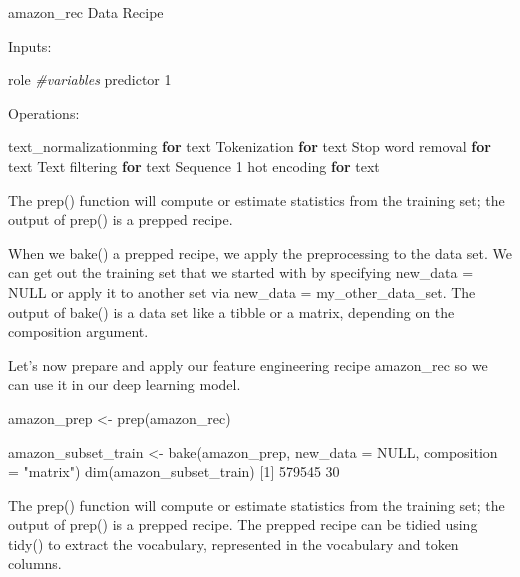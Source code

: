 \documentclass[
]{article}
\newenvironment{Shaded}{}{}
\newcommand{\AttributeTok}[1]{\textcolor[rgb]{0.49,0.56,0.16}{#1}}
\newcommand{\CommentTok}[1]{\textcolor[rgb]{0.38,0.63,0.69}{\textit{#1}}}
\newcommand{\ConstantTok}[1]{\textcolor[rgb]{0.53,0.00,0.00}{#1}}
\newcommand{\ControlFlowTok}[1]{\textcolor[rgb]{0.00,0.44,0.13}{\textbf{#1}}}
\newcommand{\DecValTok}[1]{\textcolor[rgb]{0.25,0.63,0.44}{#1}}
\newcommand{\FunctionTok}[1]{\textcolor[rgb]{0.02,0.16,0.49}{#1}}
\newcommand{\NormalTok}[1]{#1}
\newcommand{\OtherTok}[1]{\textcolor[rgb]{0.00,0.44,0.13}{#1}}
\newcommand{\SpecialCharTok}[1]{\textcolor[rgb]{0.25,0.44,0.63}{#1}}
\newcommand{\StringTok}[1]{\textcolor[rgb]{0.25,0.44,0.63}{#1}}
\begin{document}
\begin{Shaded}
\begin{Highlighting}[]
\NormalTok{amazon\_rec}
\NormalTok{Data Recipe}

\NormalTok{Inputs}\SpecialCharTok{:}

\NormalTok{      role }\CommentTok{\#variables}
\NormalTok{ predictor          }\DecValTok{1}

\NormalTok{Operations}\SpecialCharTok{:}

\NormalTok{text\_normalizationming }\ControlFlowTok{for}\NormalTok{ text}
\NormalTok{Tokenization }\ControlFlowTok{for}\NormalTok{ text}
\NormalTok{Stop word removal }\ControlFlowTok{for}\NormalTok{ text}
\NormalTok{Text filtering }\ControlFlowTok{for}\NormalTok{ text}
\NormalTok{Sequence }\DecValTok{1}\NormalTok{ hot encoding }\ControlFlowTok{for}\NormalTok{ text}
\end{Highlighting}
\end{Shaded}

The prep() function will compute or estimate statistics from the
training set; the output of prep() is a prepped recipe.

When we bake() a prepped recipe, we apply the preprocessing to the data
set. We can get out the training set that we started with by specifying
new\_data = NULL or apply it to another set via new\_data =
my\_other\_data\_set. The output of bake() is a data set like a tibble
or a matrix, depending on the composition argument.

Let's now prepare and apply our feature engineering recipe amazon\_rec
so we can use it in our deep learning model.

\begin{Shaded}
\begin{Highlighting}[]
\NormalTok{amazon\_prep }\OtherTok{\textless{}{-}} \FunctionTok{prep}\NormalTok{(amazon\_rec)}

\NormalTok{amazon\_subset\_train }\OtherTok{\textless{}{-}} \FunctionTok{bake}\NormalTok{(amazon\_prep, }\AttributeTok{new\_data =} \ConstantTok{NULL}\NormalTok{, }\AttributeTok{composition =} \StringTok{"matrix"}\NormalTok{)}
\FunctionTok{dim}\NormalTok{(amazon\_subset\_train)}
\NormalTok{[}\DecValTok{1}\NormalTok{] }\DecValTok{579545}     \DecValTok{30}
\end{Highlighting}
\end{Shaded}

The prep() function will compute or estimate statistics from the
training set; the output of prep() is a prepped recipe. The prepped
recipe can be tidied using tidy() to extract the vocabulary, represented
in the vocabulary and token columns.
\end{document}
